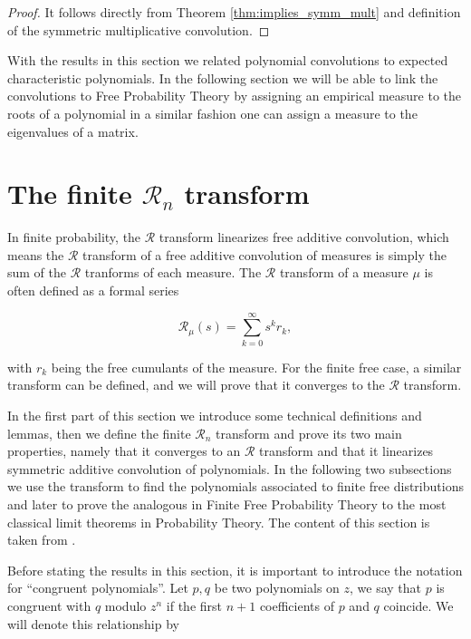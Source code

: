 \begin{proof}
    It follows directly from Theorem \ref{thm:implies_symm_mult} and definition of the symmetric multiplicative convolution.
\end{proof}

With the results in this section we related polynomial convolutions to expected characteristic polynomials. In the following section we will be able to link the convolutions to Free Probability Theory by assigning an empirical measure to the roots of a polynomial in a similar fashion one can assign a measure to the eigenvalues of a matrix.


\section{The finite \texorpdfstring{$\mathcal R_n$}{R_n} transform} 

In finite probability, the $\mathcal R$ transform linearizes free additive convolution, which means the $\mathcal R$ transform of a free additive convolution of measures is simply the sum of the $\mathcal R$ tranforms of each measure. The $\mathcal R$ transform of a measure $\mu$ is often defined as a formal series

\begin{equation*}
    \mathcal R_\mu(s) = \sum_{k=0}^\infty s^{k} r_k,
\end{equation*}

\noindent with $r_k$ being the free cumulants of the measure. For the finite free case, a similar transform can be defined, and we will prove that it converges to the $\mathcal R$ transform. %

In the first part of this section we introduce some technical definitions and lemmas, then we define the finite $\mathcal R_n$ transform and prove its two main properties, namely that it converges to an $\mathcal R$ transform and that it linearizes symmetric additive convolution of polynomials. In the following two subsections we use the transform to find the polynomials associated to finite free distributions and later to prove the analogous in Finite Free Probability Theory to the most classical limit theorems in Probability Theory. The content of this section is taken from \cite{article:marcus_finite}.

Before stating the results in this section, it is important to introduce the notation for ``congruent polynomials''. Let $p,q$ be two polynomials on $z$, we say that $p$ is congruent with $q$ modulo $z^{n}$ if the first $n+1$ coefficients of $p$ and $q$ coincide. We will denote this relationship by

